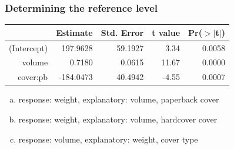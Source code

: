 
\begin{frame}
\frametitle{Determining the reference level}


{\small
\begin{center}
\begin{tabular}{rrrrr}
  \hline
 & Estimate & Std. Error & t value & Pr($>$$|$t$|$) \\ 
  \hline
(Intercept) & 197.9628 & 59.1927 & 3.34 & 0.0058 \\ 
  volume & 0.7180 & 0.0615 & 11.67 & 0.0000 \\ 
  cover:pb & -184.0473 & 40.4942 & -4.55 & 0.0007 \\ 
   \hline
\end{tabular}
\end{center}
}

\begin{enumerate}[(a)]
\item response: weight, explanatory: volume, paperback cover
\item response: weight, explanatory: volume, hardcover cover
\item response: volume, explanatory: weight, cover type
\end{enumerate}

\end{frame}


